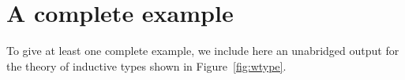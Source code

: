 \section{A complete example}
\label{sec:outp-induct-types}

To give at least one complete example, we include here an
unabridged output for the theory of inductive types shown in
Figure~\ref{fig:wtype}.


